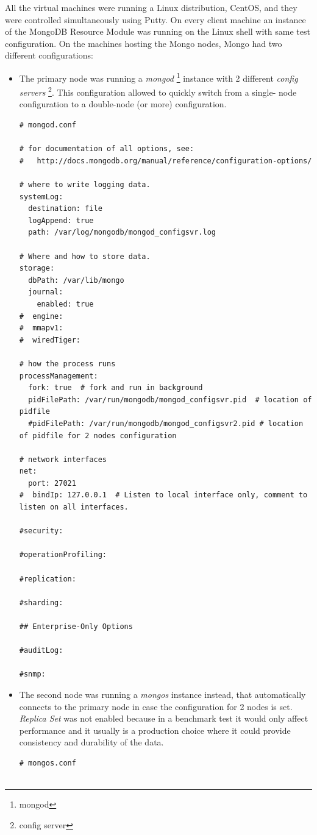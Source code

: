 All the virtual machines were running a Linux distribution, CentOS, and they were controlled simultaneously using Putty. On every  client machine an instance of the MongoDB Resource Module was running on the Linux shell with same test configuration.
On the machines hosting the Mongo nodes, Mongo had two different configurations: 
\begin{itemize}
	\item The primary node was running a \textit{mongod} \footnote{mongod} instance with 2 different \textit{config servers} \footnote{config server}. This configuration allowed to quickly switch from a single- node configuration to a double-node (or more) configuration.
\begin{lstlisting}
# mongod.conf

# for documentation of all options, see:
#   http://docs.mongodb.org/manual/reference/configuration-options/

# where to write logging data.
systemLog:
  destination: file
  logAppend: true
  path: /var/log/mongodb/mongod_configsvr.log

# Where and how to store data.
storage:
  dbPath: /var/lib/mongo
  journal:
    enabled: true
#  engine:
#  mmapv1:
#  wiredTiger:

# how the process runs
processManagement:
  fork: true  # fork and run in background
  pidFilePath: /var/run/mongodb/mongod_configsvr.pid  # location of pidfile
  #pidFilePath: /var/run/mongodb/mongod_configsvr2.pid # location of pidfile for 2 nodes configuration

# network interfaces
net:
  port: 27021
#  bindIp: 127.0.0.1  # Listen to local interface only, comment to listen on all interfaces.

#security:

#operationProfiling:

#replication:

#sharding:

## Enterprise-Only Options

#auditLog:

#snmp:
\end{lstlisting}
\newpage
 	\item The second node was running a \textit{mongos} instance instead, that automatically connects to the primary node in case the configuration for 2 nodes is set. \textit{Replica Set} was not enabled because in a benchmark test it would only affect performance and it usually is a production choice where it could provide consistency and durability of the data.
\begin{lstlisting}
# mongos.conf


\end{lstlisting}
\end{itemize}
